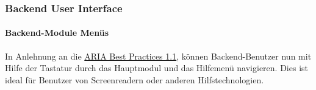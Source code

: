 %

\begin{frame}[fragile]
	\frametitle{Backend User Interface}
	\framesubtitle{Backend-Module Menüs}

	In Anlehnung an die
	\href{https://www.w3.org/TR/wai-aria-practices-1.1/}{ARIA Best Practices 1.1},
	können Backend-Benutzer nun mit Hilfe der Tastatur durch das Hauptmodul
	und das Hilfemenü navigieren. Dies ist ideal für Benutzer von Screenreadern
	oder anderen Hilfstechnologien.


\end{frame}

